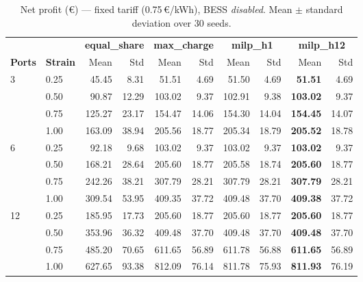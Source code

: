 \begin{table}[!htb]
\centering
\caption{Net profit (€) — fixed tariff (0.75\,€/kWh), BESS \emph{disabled}.
         Mean $\pm$ standard deviation over 30 seeds.}
\label{tab:gc_fixed_nobess_profit}
\setlength{\tabcolsep}{4.5pt}
\begin{tabular}{ll rrrrrrrr}
\toprule
 & & \multicolumn{2}{c}{\textbf{equal\_share}}
   & \multicolumn{2}{c}{\textbf{max\_charge}}
   & \multicolumn{2}{c}{\textbf{milp\_h1}}
   & \multicolumn{2}{c}{\textbf{milp\_h12}} \\
\cmidrule(lr){3-4}\cmidrule(lr){5-6}\cmidrule(lr){7-8}\cmidrule(lr){9-10}
\textbf{Ports} & \textbf{Strain} &
  Mean & Std & Mean & Std & Mean & Std & Mean & Std \\
\midrule
\multirow{4}{*}{3}
  & 0.25 &  45.45 &  8.31 &  51.51 &  4.69 &  51.50 &  4.69 & \textbf{51.51} &  4.69 \\
  & 0.50 &  90.87 & 12.29 & 103.02 &  9.37 & 102.91 &  9.38 & \textbf{103.02} &  9.37 \\
  & 0.75 & 125.27 & 23.17 & 154.47 & 14.06 & 154.30 & 14.04 & \textbf{154.45} & 14.07 \\
  & 1.00 & 163.09 & 38.94 & 205.56 & 18.77 & 205.34 & 18.79 & \textbf{205.52} & 18.78 \\
\midrule
\multirow{4}{*}{6}
  & 0.25 &  92.18 &  9.68 & 103.02 &  9.37 & 103.02 &  9.37 & \textbf{103.02} &  9.37 \\
  & 0.50 & 168.21 & 28.64 & 205.60 & 18.77 & 205.58 & 18.74 & \textbf{205.60} & 18.77 \\
  & 0.75 & 242.26 & 38.21 & 307.79 & 28.21 & 307.79 & 28.21 & \textbf{307.79} & 28.21 \\
  & 1.00 & 309.54 & 53.95 & 409.35 & 37.72 & 409.48 & 37.70 & \textbf{409.38} & 37.72 \\
\midrule
\multirow{4}{*}{12}
  & 0.25 & 185.95 & 17.73 & 205.60 & 18.77 & 205.60 & 18.77 & \textbf{205.60} & 18.77 \\
  & 0.50 & 353.96 & 36.32 & 409.48 & 37.70 & 409.48 & 37.70 & \textbf{409.48} & 37.70 \\
  & 0.75 & 485.20 & 70.65 & 611.65 & 56.89 & 611.78 & 56.88 & \textbf{611.65} & 56.89 \\
  & 1.00 & 627.65 & 93.38 & 812.09 & 76.14 & 811.78 & 75.93 & \textbf{811.93} & 76.19 \\
\bottomrule
\end{tabular}
\end{table}

